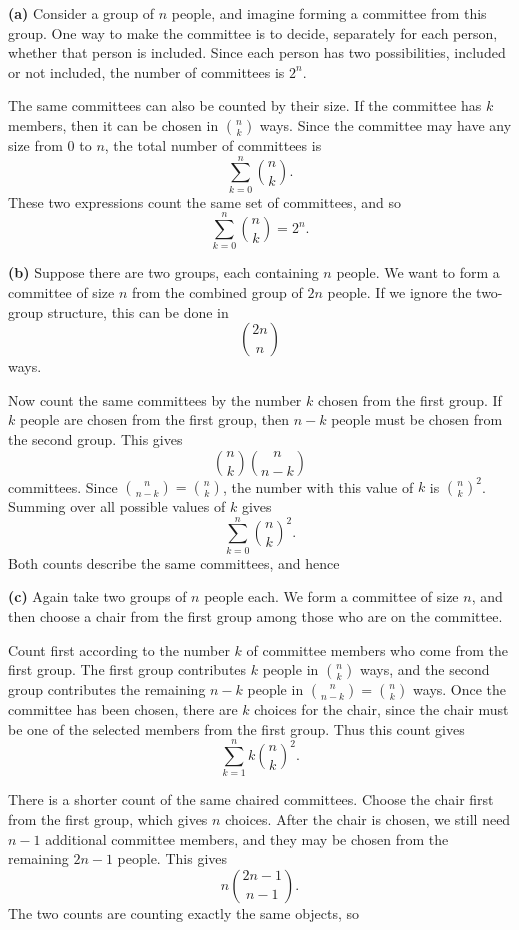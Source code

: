 \documentclass[11pt]{article}
\begin{document}
\begin{solutionbox}
\textbf{(a)} Consider a group of \(n\) people, and imagine forming a committee from this group. One way to make the committee is to decide, separately for each person, whether that person is included. Since each person has two possibilities, included or not included, the number of committees is \(2^n\).

The same committees can also be counted by their size. If the committee has \(k\) members, then it can be chosen in \(\binom{n}{k}\) ways. Since the committee may have any size from 0 to \(n\), the total number of committees is
\[
\sum_{k=0}^{n}\binom{n}{k}.
\]
These two expressions count the same set of committees, and so
\[
\sum_{k=0}^{n}\binom{n}{k}=2^n.
\]

\textbf{(b)} Suppose there are two groups, each containing \(n\) people. We want to form a committee of size \(n\) from the combined group of \(2n\) people. If we ignore the two-group structure, this can be done in
\[
\binom{2n}{n}
\]
ways.

Now count the same committees by the number \(k\) chosen from the first group. If \(k\) people are chosen from the first group, then \(n-k\) people must be chosen from the second group. This gives
\[
\binom{n}{k}\binom{n}{n-k}
\]
committees. Since \(\binom{n}{n-k}=\binom{n}{k}\), the number with this value of \(k\) is \(\binom{n}{k}^2\). Summing over all possible values of \(k\) gives
\[
\sum_{k=0}^{n}\binom{n}{k}^2.
\]
Both counts describe the same committees, and hence



\textbf{(c)} Again take two groups of \(n\) people each. We form a committee of size \(n\), and then choose a chair from the first group among those who are on the committee.

Count first according to the number \(k\) of committee members who come from the first group. The first group contributes \(k\) people in \(\binom{n}{k}\) ways, and the second group contributes the remaining \(n-k\) people in \(\binom{n}{n-k}=\binom{n}{k}\) ways. Once the committee has been chosen, there are \(k\) choices for the chair, since the chair must be one of the selected members from the first group. Thus this count gives
\[
\sum_{k=1}^{n} k\binom{n}{k}^2.
\]

There is a shorter count of the same chaired committees. Choose the chair first from the first group, which gives \(n\) choices. After the chair is chosen, we still need \(n-1\) additional committee members, and they may be chosen from the remaining \(2n-1\) people. This gives
\[
n\binom{2n-1}{n-1}.
\]
The two counts are counting exactly the same objects, so

\end{solutionbox}
\newpage
\end{document}
